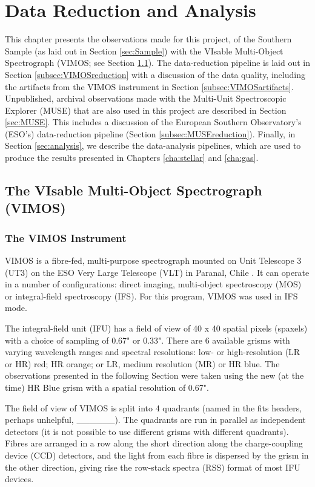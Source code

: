 \chapter{Data Reduction and Analysis}
	\label{cha:Data}
This chapter presents the observations made for this project, of the Southern Sample (as laid out in Section \ref{sec:Sample}) with the VIsable Multi-Object Spectrograph (VIMOS; see Section \ref{sec:VIMOS}). The data-reduction pipeline is laid out in Section \ref{subsec:VIMOSreduction} with a discussion of the data quality, including the artifacts from the VIMOS instrument in Section \ref{subsec:VIMOSartifacts}. Unpublished, archival observations made with the Multi-Unit Spectroscopic Explorer (MUSE) that are also used in this project are described in Section \ref{sec:MUSE}. This includes a discussion of the European Southern Observatory's (ESO's) data-reduction pipeline (Section \ref{subsec:MUSEreduction}). Finally, in Section \ref{sec:analysis}, we describe the data-analysis pipelines, which are used to produce the results presented in Chapters \ref{cha:stellar} and \ref{cha:gas}.  

\section{The VIsable Multi-Object Spectrograph (VIMOS)}
	\label{sec:VIMOS}
	\subsection{The VIMOS Instrument}
		VIMOS is a fibre-fed, multi-purpose spectrograph mounted on Unit Telescope 3 (UT3) on the ESO Very Large Telescope (VLT) in Paranal, Chile \citep{LeFevre2003}. It can operate in a number of configurations: direct imaging, multi-object spectroscopy (MOS) or integral-field spectroscopy (IFS). For this program, VIMOS was used in IFS mode. 

		The integral-field unit (IFU) has a field of view of 40 x 40 spatial pixels (spaxels) with a choice of sampling of 0.67" or 0.33". There are 6 available grisms with varying wavelength ranges and spectral resolutions: low- or high-resolution (LR or HR) red; HR orange; or LR, medium resolution (MR) or HR blue. The observations presented in the following Section were taken using the new (at the time) HR Blue grism with a spatial resolution of 0.67". 

		The field of view of VIMOS is split into 4 quadrants (named in the fits headers, perhaps unhelpful, \_\_\_\_\_\_). The quadrants are run in parallel as independent detectors (it is not possible to use different grisms with different quadrants). Fibres are arranged in a row along the short direction along the charge-coupling device (CCD) detectors, and the light from each fibre is dispersed by the grism in the other direction, giving rise the row-stack spectra (RSS) format of most IFU devices.

